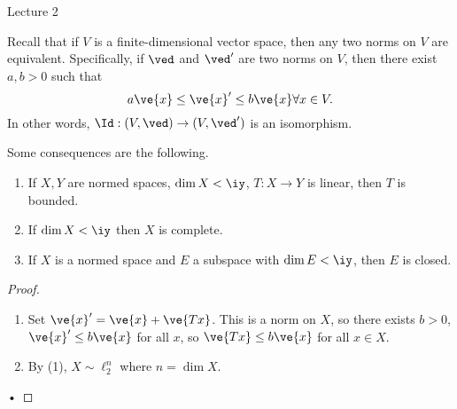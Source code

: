 {\color{blue}Lecture 2}

Recall that if $V$ is a finite-dimensional vector space, then any two norms on $V$ are equivalent. Specifically, if $\ved$ and $\ved'$ are two norms on $V$, then there exist $a,b>0$ such that 
\[
a\ve{x}\le\ve{x}'\le b\ve{x}\forall x\in V.
\]
In other words, $\Id:(V,\ved)\to (V,\ved')$ is an isomorphism. 

Some consequences are the following.
\begin{cor}
\begin{enumerate}
\item
If $X,Y$ are normed spaces, $\dim X<\iy$, $T:X\to Y$ is linear, then $T$ is bounded.
\item
If $\dim X<\iy$ then $X$ is complete. 
\item If $X$ is a normed space and $E$ a subspace with $\dim E<\iy$, then $E$ is closed.
\end{enumerate}
\end{cor}
\begin{proof}
\begin{enumerate}
\item
Set $\ve{x}'=\ve{x}+\ve{Tx}$. This is a norm on $X$, so there exists $b>0$, $\ve{x}'\le b\ve{x}$ for all $x$, so $\ve{Tx}\le b\ve{x}$ for all $x\in X$. 

\item
By (1), $X\sim \ell_2^n$ where $n=\dim X$.
\end{enumerate}•
\end{proof}
